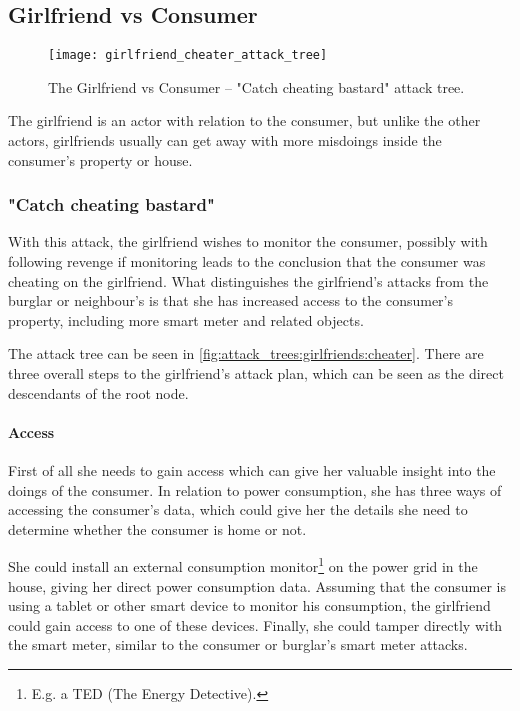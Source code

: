 \subsection{Girlfriend vs Consumer}

\begin{figure}
	\texttt{[image: girlfriend\_cheater\_attack\_tree]}
	\label{fig:attack_trees:girlfriend:cheater}
	\caption{The Girlfriend vs Consumer -- "Catch cheating bastard" attack tree.}
\end{figure}

The girlfriend is an actor with relation to the consumer, but unlike the other actors, girlfriends usually can get away with more misdoings inside the consumer's property or house.

\subsubsection{"Catch cheating bastard"}

With this attack, the girlfriend wishes to monitor the consumer, possibly with following revenge if monitoring leads to the conclusion that the consumer was cheating on the girlfriend.
What distinguishes the girlfriend's attacks from the burglar or neighbour's is that she has increased access to the consumer's property, including more smart meter and related objects.

The attack tree can be seen in \cref{fig:attack_trees:girlfriends:cheater}.
There are three overall steps to the girlfriend's attack plan, which can be seen as the direct descendants of the root node.

\paragraph{Access}
First of all she needs to gain access which can give her valuable insight into the doings of the consumer.
In relation to power consumption, she has three ways of accessing the consumer's data, which could give her the details she need to determine whether the consumer is home or not.

She could install an external consumption monitor\footnote{E.g. a TED (The Energy Detective).} on the power grid in the house, giving her direct power consumption data.
Assuming that the consumer is using a tablet or other smart device to monitor his consumption, the girlfriend could gain access to one of these devices.
Finally, she could tamper directly with the smart meter, similar to the consumer or burglar's smart meter attacks.

